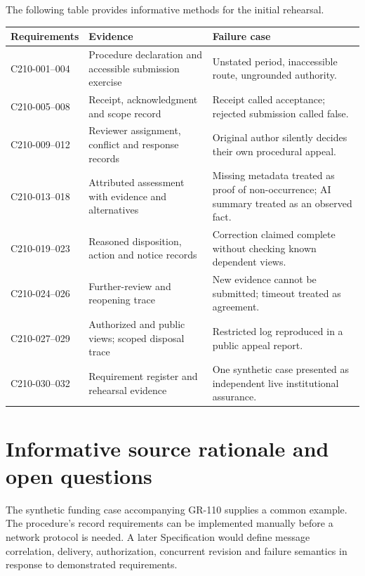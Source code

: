\documentclass[11pt,a4paper]{article}
\begin{document}
The following table provides informative methods for the initial rehearsal.
\begin{longtable}{L{0.23\textwidth}L{0.34\textwidth}L{0.35\textwidth}}
\toprule
Requirements & Evidence & Failure case\\
\midrule
\endhead
C210-001--004 & Procedure declaration and accessible submission exercise & Unstated period, inaccessible route, ungrounded authority.\\
C210-005--008 & Receipt, acknowledgment and scope record & Receipt called acceptance; rejected submission called false.\\
C210-009--012 & Reviewer assignment, conflict and response records & Original author silently decides their own procedural appeal.\\
C210-013--018 & Attributed assessment with evidence and alternatives & Missing metadata treated as proof of non-occurrence; AI summary treated as an observed fact.\\
C210-019--023 & Reasoned disposition, action and notice records & Correction claimed complete without checking known dependent views.\\
C210-024--026 & Further-review and reopening trace & New evidence cannot be submitted; timeout treated as agreement.\\
C210-027--029 & Authorized and public views; scoped disposal trace & Restricted log reproduced in a public appeal report.\\
C210-030--032 & Requirement register and rehearsal evidence & One synthetic case presented as independent live institutional assurance.\\
\bottomrule
\end{longtable}

\section{Informative source rationale and open questions}
The synthetic funding case accompanying GR-110 supplies a common example. The procedure's record requirements can be implemented manually before a network protocol is needed. A later Specification would define message correlation, delivery, authorization, concurrent revision and failure semantics in response to demonstrated requirements.

\end{document}
